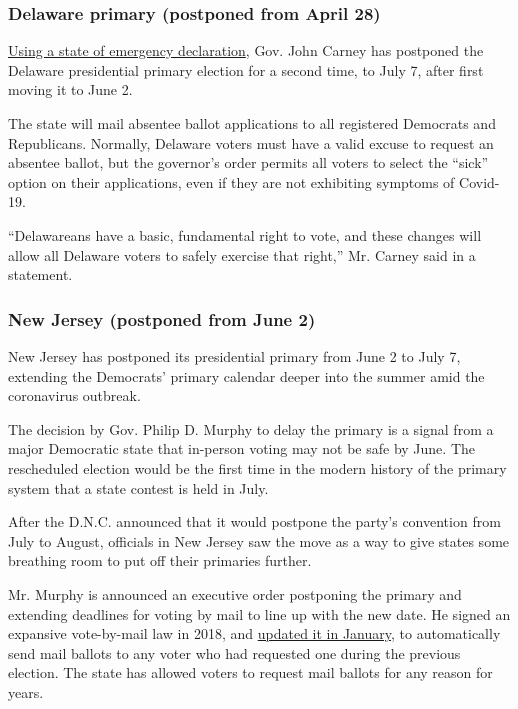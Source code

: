 \hypertarget{delaware-primary-postponed-from-april-28}{%
\subsubsection{Delaware primary (postponed from April
28)}\label{delaware-primary-postponed-from-april-28}}

\href{https://news.delaware.gov/2020/05/07/governor-carney-reschedules-presidential-primary-for-july-7/}{Using
a state of emergency declaration}, Gov. John Carney has postponed the
Delaware presidential primary election for a second time, to July 7,
after first moving it to June 2.

The state will mail absentee ballot applications to all registered
Democrats and Republicans. Normally, Delaware voters must have a valid
excuse to request an absentee ballot, but the governor's order permits
all voters to select the ``sick'' option on their applications, even if
they are not exhibiting symptoms of Covid-19.

``Delawareans have a basic, fundamental right to vote, and these changes
will allow all Delaware voters to safely exercise that right,'' Mr.
Carney said in a statement.

\hypertarget{new-jersey-postponed-from-june-2}{%
\subsubsection{New Jersey (postponed from June
2)}\label{new-jersey-postponed-from-june-2}}

New Jersey has postponed its presidential primary from June 2 to July 7,
extending the Democrats' primary calendar deeper into the summer amid
the coronavirus outbreak.

The decision by Gov. Philip D. Murphy to delay the primary is a signal
from a major Democratic state that in-person voting may not be safe by
June. The rescheduled election would be the first time in the modern
history of the primary system that a state contest is held in July.

After the D.N.C. announced that it would postpone the party's convention
from July to August, officials in New Jersey saw the move as a way to
give states some breathing room to put off their primaries further.

Mr. Murphy is announced an executive order postponing the primary and
extending deadlines for voting by mail to line up with the new date. He
signed an expansive vote-by-mail law in 2018, and
\href{https://www.nj.com/politics/2020/01/murphy-approves-fix-to-law-encouraging-voting-by-mail-after-it-was-killed-by-powerful-board.html}{updated
it in January}, to automatically send mail ballots to any voter who had
requested one during the previous election. The state has allowed voters
to request mail ballots for any reason for years.

